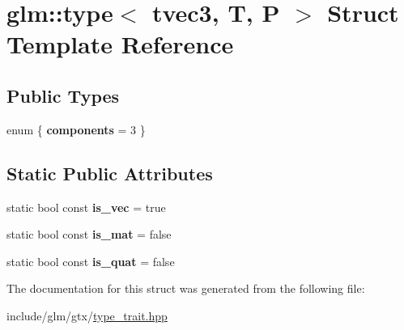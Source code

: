 \hypertarget{structglm_1_1type_3_01tvec3_00_01T_00_01P_01_4}{}\section{glm\+:\+:type$<$ tvec3, T, P $>$ Struct Template Reference}
\label{structglm_1_1type_3_01tvec3_00_01T_00_01P_01_4}
\subsection*{Public Types}
\begin{DoxyCompactItemize}
\item 
\mbox{\label{structglm_1_1type_3_01tvec3_00_01T_00_01P_01_4_af6ca4f8609565970f76a10ed0d3c125b}} 
enum \{ {\bfseries components} = 3
 \}
\end{DoxyCompactItemize}
\subsection*{Static Public Attributes}
\begin{DoxyCompactItemize}
\item 
\mbox{\label{structglm_1_1type_3_01tvec3_00_01T_00_01P_01_4_a6932aaf64b066720cdf04b0675e21ef0}} 
static bool const {\bfseries is\+\_\+vec} = true
\item 
\mbox{\label{structglm_1_1type_3_01tvec3_00_01T_00_01P_01_4_aa59dc278af68be9ba7ca8f98b5a25630}} 
static bool const {\bfseries is\+\_\+mat} = false
\item 
\mbox{\label{structglm_1_1type_3_01tvec3_00_01T_00_01P_01_4_a6650d3af422d07f8b071c19dd59bd173}} 
static bool const {\bfseries is\+\_\+quat} = false
\end{DoxyCompactItemize}


The documentation for this struct was generated from the following file\+:\begin{DoxyCompactItemize}
\item 
include/glm/gtx/\hyperlink{type__trait_8hpp}{type\+\_\+trait.\+hpp}\end{DoxyCompactItemize}
